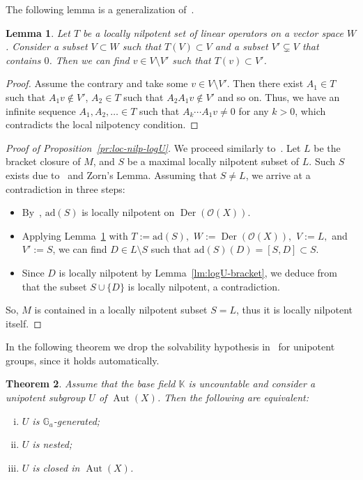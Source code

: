 \documentclass[12pt,a4paper]{amsart}
\theoremstyle{plain}
\newtheorem{theorem}{Theorem}[section]
\newtheorem{lemma}[theorem]{Lemma}
\theoremstyle{definition}
\theoremstyle{remark}
\def\Aut{\operatorname{Aut}}
\def\Der{\operatorname{Der}}
\def\K{{\mathbb K}}
\def\G{{\mathbb G}}
\def\cO{{\mathcal O}}
\begin{document}
The following lemma is a generalization of~\cite[Lemma 1]{Skutin}.
 
\begin{lemma}\label{lm:Sk-1}
   Let $T$ be a locally nilpotent %
   set of linear operators on a vector space $W$.
   Consider a subset $V\subset W$ such that $T(V)\subset V$
   and a subset $V'\subsetneq V$ that contains $0$.
Then we can find $v \in V \setminus V'$ such that $T(v)\subset V'$.
\end{lemma}
\begin{proof}
Assume the contrary and take some $v \in V \setminus V'$. Then there exist $A_1 \in T$ such that $A_1 v \notin V'$, $A_2 \in T$ such that $A_2 A_1 v \notin V'$ and so on.
Thus, we have an infinite sequence $A_1,A_2,\ldots\in T$ such that $A_k\cdots A_1 v\neq0$ for any $k>0$, which contradicts the local nilpotency condition.
\end{proof}

\begin{proof}[Proof of Proposition~\ref{pr:loc-nilp-logU}]
We proceed similarly to~\cite[Proposition]{Skutin}. 
Let
   $L$ be the bracket closure of  $M$, and 
   $S$ be a maximal locally nilpotent subset of $L$. 
Such $S$ exists due to~\cite[Corollary 2]{Skutin} and Zorn's Lemma. 
 Assuming that $S\neq L$, we arrive at a contradiction in three steps:
 \begin{itemize}
   \item By~\cite[Theorem 5]{Skutin}, $\text{ad}(S)$ is locally nilpotent on $\Der(\cO(X))$.
   \item Applying Lemma~\ref{lm:Sk-1} with 
   $T:=\text{ad}(S),$ $W:=\Der(\cO(X)),$ $V:=L,$ and $V':=S$,
   we can find $D \in L\setminus S$ such that $\text{ad}(S)(D)=[S,D] \subset S$.
   \item Since $D$ is locally nilpotent by Lemma~\ref{lm:logU-bracket}, we deduce from~\cite[Lemma 2]{Skutin} that the subset $S\cup\{D\}$ is locally nilpotent, a contradiction.
 \end{itemize}
 So, $M$ is contained in a locally nilpotent subset $S=L$, thus it is locally nilpotent itself. 
\end{proof}




In the following theorem we drop the solvability hypothesis in~\cite[Theorem~B]{KZ} for unipotent groups, since it holds automatically. 

\begin{theorem}
   \label{th:nested=closed}
   Assume that the base field $\K$ is uncountable and consider a unipotent subgroup $U$ of $\Aut(X)$. Then the following are equivalent:
   \begin{enumerate}[(i)]
      \item $U$ is $\G_a$-generated;
      \item $U$ is nested;
      \item $U$ is closed in $\Aut(X)$.
   \end{enumerate}
\end{theorem}
\end{document}
